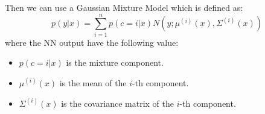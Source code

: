 Then we can use a Gaussian Mixture Model which is defined as:
\begin{equation}
    p(y|x) = \sum_{i=1}^n p(c= i|x) N(y; \mu^{(i)}(x), \Sigma^{(i)}(x))
\end{equation}
where the NN output have the following value:
\begin{itemize}
    \item $p(c=i|x)$ is the mixture component.
    \item $\mu^{(i)}(x)$ is the mean of the $i$-th component.
    \item $\Sigma^{(i)}(x)$ is the covariance matrix of the $i$-th component.
\end{itemize}